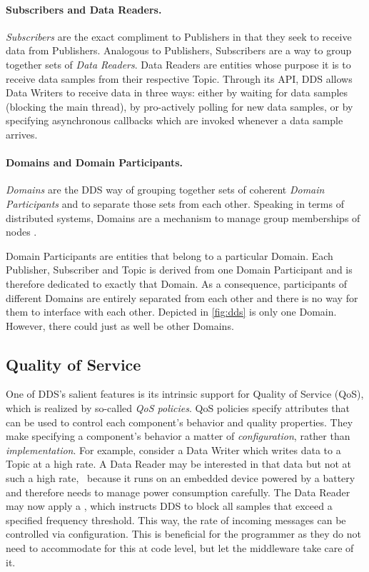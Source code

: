 \paragraph{Subscribers and Data Readers.}
\emph{Subscribers} are the exact compliment to Publishers in that they seek to receive data from Publishers. Analogous to Publishers, Subscribers are a way to group together sets of \emph{Data Readers}. Data Readers are entities whose purpose it is to receive data samples from their respective Topic. Through its API, DDS allows Data Writers to receive data in three ways: either by waiting for data samples (blocking the main thread), by pro-actively polling for new data samples, or by specifying asynchronous callbacks which are invoked whenever a data sample arrives.

\paragraph{Domains and Domain Participants.}
\emph{Domains} are the DDS way of grouping together sets of coherent \emph{Domain Participants} and to separate those sets from each other. Speaking in terms of distributed systems, Domains are a mechanism to manage group memberships of nodes \cite{tanenbaum2017distributed}. 

Domain Participants are entities that belong to a particular Domain. Each Publisher, Subscriber and Topic is derived from one Domain Participant and is therefore dedicated to exactly that Domain. As a consequence, participants of different Domains are entirely separated from each other and there is no way for them to interface with each other. Depicted in \autoref{fig:dds} is only one Domain. However, there could just as well be other Domains. 


\subsection{Quality of Service}
One of DDS's salient features is its intrinsic support for Quality of Service (QoS), which is realized by so-called \emph{QoS policies}. QoS policies specify attributes that can be used to control each component's behavior and quality properties. They make specifying a component's behavior a matter of \emph{configuration}, rather than \emph{implementation}. For example, consider a Data Writer which writes data to a Topic at a high rate. A Data Reader may be interested in that data but not at such a high rate, \eg\ because it runs on an embedded device powered by a battery and therefore needs to manage power consumption carefully. The Data Reader may now apply a \tbf , which instructs DDS to block all samples that exceed a specified frequency threshold. This way, the rate of incoming messages can be controlled via configuration. This is beneficial for the programmer as they do not need to accommodate for this at code level, but let the middleware take care of it.


